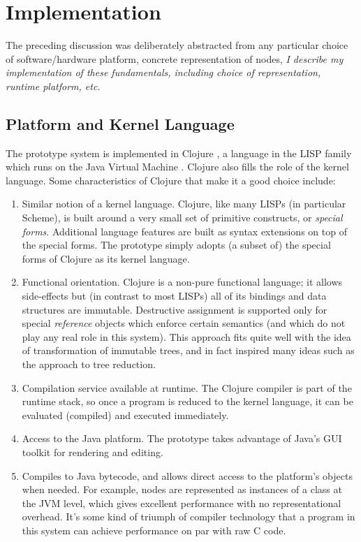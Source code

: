 \section{Implementation}
The preceding discussion was deliberately abstracted from any particular choice of software/hardware platform, concrete representation of nodes, 
\textit{I describe my implementation of these fundamentals, including choice of representation, runtime platform, etc.}


\subsection{Platform and Kernel Language}
The prototype system is implemented in Clojure \cite{hickey}, a language in the LISP family which runs on the Java Virtual Machine \cite{gosling}. Clojure also fills the role of the kernel language. Some characteristics of Clojure that make it a good choice include:
\begin{enumerate}
\item Similar notion of a kernel language. Clojure, like many LISPs (in particular Scheme\cite{dibvig}), is built around a very small set of primitive constructs, or \emph{special forms}. Additional language features are built as syntax extensions on top of the special forms. The prototype simply adopts (a subset of) the special forms of Clojure as its kernel language.
\item Functional orientation. Clojure is a non-pure functional language; it allows side-effects but (in contrast to most LISPs) all of its bindings and data structures are immutable. Destructive assignment is supported only for special \emph{reference} objects which enforce certain semantics (and which do not play any real role in this system). This approach fits quite well with the idea of transformation of immutable trees, and in fact inspired many ideas such as the approach to tree reduction.
\item Compilation service available at runtime. The Clojure compiler is part of the runtime stack, so once a program is reduced to the kernel language, it can be evaluated (compiled) and executed immediately.
\item Access to the Java platform. The prototype takes advantage of Java's GUI toolkit for rendering and editing.
\item Compiles to Java bytecode, and allows direct access to the platform's objects when needed. For example, nodes are represented as instances of a class at the JVM level, which gives excellent performance with no representational overhead. It's some kind of triumph of compiler technology that a program in this system can achieve performance on par with raw C code. 
\end{enumerate}

